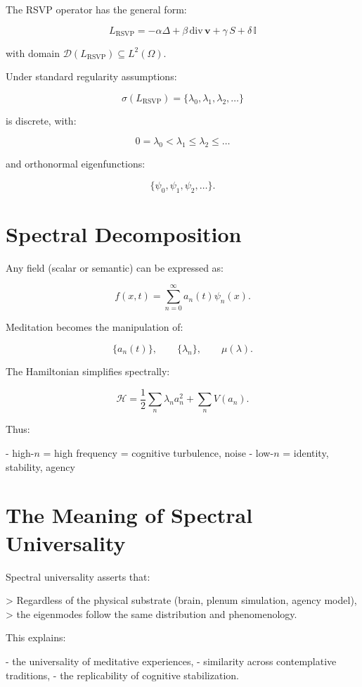 \documentclass[12pt]{article}
\begin{document}
The RSVP operator has the general form:

\[
L_{\text{RSVP}}
    = -\alpha\Delta
      + \beta\,\mathrm{div}\,\mathbf{v}
      + \gamma\,S
      + \delta\,\mathbb{I}
\]

with domain $\mathcal{D}(L_{\text{RSVP}}) \subseteq L^2(\Omega)$.

Under standard regularity assumptions:

\[
\sigma(L_{\text{RSVP}})
    = \{\lambda_0, \lambda_1, \lambda_2, \dots\}
\]

is discrete, with:

\[
0 = \lambda_0 < \lambda_1 \le \lambda_2 \le \dots
\]

and orthonormal eigenfunctions:

\[
\{\psi_0, \psi_1, \psi_2, \dots\}.
\]

\section{Spectral Decomposition}

Any field (scalar or semantic) can be expressed as:

\[
f(x,t)
    = \sum_{n=0}^{\infty} a_n(t)\psi_n(x).
\]

Meditation becomes the manipulation of:

\[
\{a_n(t)\},\qquad \{\lambda_n\},\qquad \mu(\lambda).
\]

The Hamiltonian simplifies spectrally:

\[
\mathcal{H}
    = \frac12\sum_{n} \lambda_n a_n^2
    + \sum_{n} V(a_n).
\]

Thus:

- high-$n$ = high frequency = cognitive turbulence, noise  
- low-$n$ = identity, stability, agency  

\section{The Meaning of Spectral Universality}

Spectral universality asserts that:

> Regardless of the physical substrate (brain, plenum simulation, agency model),
> the eigenmodes follow the same distribution and phenomenology.

This explains:

- the universality of meditative experiences,  
- similarity across contemplative traditions,  
- the replicability of cognitive stabilization.
\end{document}
